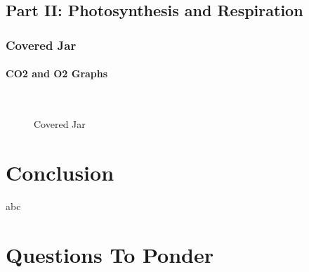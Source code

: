 \documentclass[a4paper, 12pt, english]{article}
\begin{document}
\subsection{Part II: Photosynthesis and Respiration}
\subsubsection{Covered Jar}
\paragraph{CO2 and O2 Graphs}

\begin{figure}[!ht]
	\centering
	\\
	\qquad
	\qquad
	\caption{Covered Jar}
	\label{fig:CoveredJar}
\end{figure}

\section{Conclusion}
abc

\section{Questions To Ponder}
\end{document}
